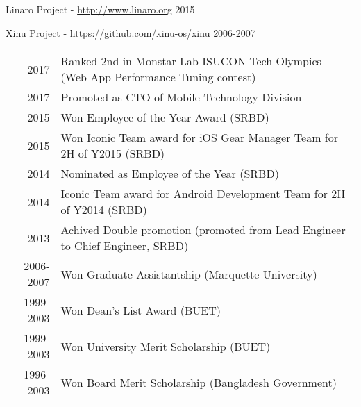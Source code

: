 \documentclass[10pt,a4paper]{article} %
\begin{document}

\headedsubsection
{Linaro Project - \href{http://www.linaro.org}{http://www.linaro.org}}
{2015}
{}

\headedsubsection
{Xinu Project - \href{https://github.com/xinu-os/xinu}{https://github.com/xinu-os/xinu}}
{2006-2007}
{}


\spacedhrule{1.6em}{-0.4em} %


{}


\spacedhrule{1.6em}{-0.4em} %

\begin{longtable}{rl}
2017	   &    Ranked 2nd in Monstar Lab ISUCON Tech Olympics (Web App Performance Tuning contest) \\
2017   &     Promoted as CTO of Mobile Technology Division \\
2015	   &    Won Employee of the Year Award (SRBD)\\
2015	   &    Won Iconic Team award for iOS Gear Manager Team for 2H of Y2015 (SRBD)\\
2014   &    Nominated as Employee of the Year (SRBD)\\
2014	   &    Iconic Team award for Android Development Team for 2H of Y2014 (SRBD)\\
2013   &    Achived Double promotion (promoted from Lead Engineer to Chief Engineer, SRBD) \\
2006-2007 &    Won Graduate Assistantship (Marquette University)\\
1999-2003 &    Won Dean's List Award (BUET)\\
1999-2003 &    Won University Merit Scholarship (BUET)\\
1996-2003 &    Won Board Merit Scholarship (Bangladesh Government)
\end{longtable}
\end{document}
